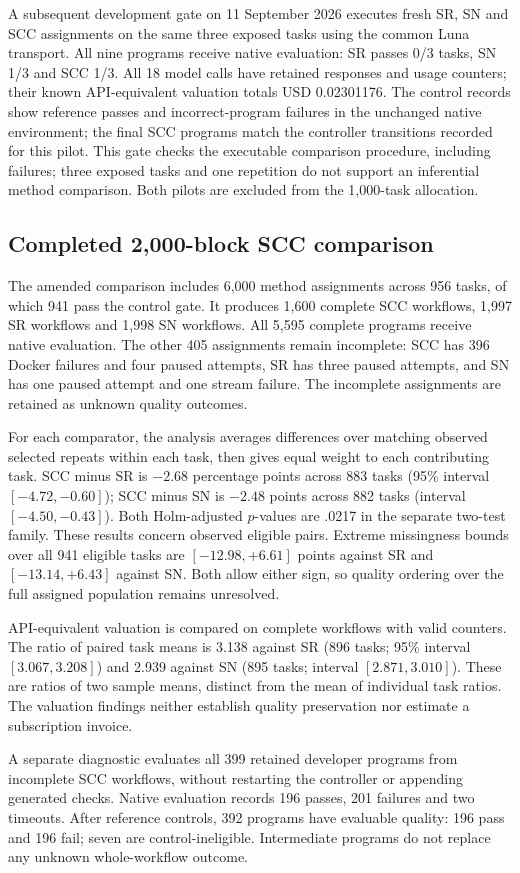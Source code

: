 A subsequent development gate on 11 September 2026 executes fresh SR, SN and SCC assignments on the same three exposed tasks using the common Luna transport. All nine programs receive native evaluation: SR passes 0/3 tasks, SN 1/3 and SCC 1/3. All 18 model calls have retained responses and usage counters; their known API-equivalent valuation totals USD 0.02301176. The control records show reference passes and incorrect-program failures in the unchanged native environment; the final SCC programs match the controller transitions recorded for this pilot. This gate checks the executable comparison procedure, including failures; three exposed tasks and one repetition do not support an inferential method comparison. Both pilots are excluded from the 1,000-task allocation.

\subsection{Completed 2,000-block SCC comparison}
The amended comparison includes 6,000 method assignments across 956 tasks, of which 941 pass the control gate. It produces 1,600 complete SCC workflows, 1,997 SR workflows and 1,998 SN workflows. All 5,595 complete programs receive native evaluation. The other 405 assignments remain incomplete: SCC has 396 Docker failures and four paused attempts, SR has three paused attempts, and SN has one paused attempt and one stream failure. The incomplete assignments are retained as unknown quality outcomes.

For each comparator, the analysis averages differences over matching observed selected repeats within each task, then gives equal weight to each contributing task. SCC minus SR is $-2.68$ percentage points across 883 tasks (95\% interval $[-4.72,-0.60]$); SCC minus SN is $-2.48$ points across 882 tasks (interval $[-4.50,-0.43]$). Both Holm-adjusted $p$-values are .0217 in the separate two-test family. These results concern observed eligible pairs. Extreme missingness bounds over all 941 eligible tasks are $[-12.98,+6.61]$ points against SR and $[-13.14,+6.43]$ against SN. Both allow either sign, so quality ordering over the full assigned population remains unresolved.

API-equivalent valuation is compared on complete workflows with valid counters. The ratio of paired task means is 3.138 against SR (896 tasks; 95\% interval $[3.067,3.208]$) and 2.939 against SN (895 tasks; interval $[2.871,3.010]$). These are ratios of two sample means, distinct from the mean of individual task ratios. The valuation findings neither establish quality preservation nor estimate a subscription invoice.

A separate diagnostic evaluates all 399 retained developer programs from incomplete SCC workflows, without restarting the controller or appending generated checks. Native evaluation records 196 passes, 201 failures and two timeouts. After reference controls, 392 programs have evaluable quality: 196 pass and 196 fail; seven are control-ineligible. Intermediate programs do not replace any unknown whole-workflow outcome.
